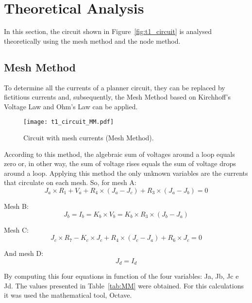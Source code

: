 \section{Theoretical Analysis}
\label{sec:analysis}

In this section, the circuit shown in Figure~\ref{fig:t1_circuit} is analysed
theoretically using the mesh method and the node method.

\subsection{Mesh Method}

To determine all the currents of a planner circuit, they can be replaced by fictitious currents and, subsequently, the Mesh Method based on Kirchhoff's Voltage Law and Ohm's Law can be applied.\par

\begin{figure}[h] \centering
\texttt{[image: t1\_circuit\_MM.pdf]}
\caption{Circuit with mesh currents (Mesh Method).}
\label{fig:t1_circuit_MM}
\end{figure}


\par
According to this method, the algebraic sum of voltages around a loop equals zero or, in other way, the sum of voltage rises equals the sum of voltage drops around a loop. Applying this method the only unknown variables are the currents that circulate on each mesh. So, for mesh A:
\begin{equation}
  J_a\times R_1 + V_a + R_4\times (J_a - J_c) + R_3\times (J_a - J_b) = 0
  \label{eq:kvl}
\end{equation}

Mesh B:
\begin {equation}
  J_b = I_b = K_b\times V_b = K_b\times R_3\times (J_b - J_a)
  \label {eq:kvl}
\end{equation}

Mesh C:
\begin {equation}
  J_c\times R_7 - K_c\times J_c + R_4\times (J_c - J_a) + R_6\times J_c = 0
  \label {eq:kvl}
\end{equation}

And mesh D:
\begin {equation}
  J_d = I_d
  \label {eq:kvl}
\end{equation}
 
 By computing this four equations in function of the four variables: Ja, Jb, Jc e Jd. The values presented in Table~\ref{tab:MM} were obtained. For this calculations it was used the mathematical tool, Octave.

